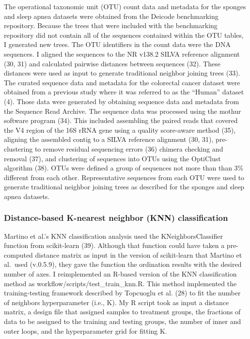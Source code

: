 \documentclass[
  11pt,
]{article}
\begin{document}
The operational taxonomic unit (OTU) count data and metadata for the
sponges and sleep apnea datasets were obtained from the Deicode
benchmarking repository. Because the trees that were included with the
benchmarking repository did not contain all of the sequences contained
within the OTU tables, I generated new trees. The OTU identifiers in the
count data were the DNA sequences. I aligned the sequences to the NR
v138.2 SILVA reference alignment (30, 31) and calculated pairwise
distances between sequences (32). These distances were used as input to
generate traditional neighbor joining trees (33). The curated sequence
data and metadata for the colorectal cancer dataset were obtained from a
previous study where it was referred to as the ``Human'' dataset (4).
Those data were generated by obtaining sequence data and metadata from
the Sequence Read Archive. The sequence data was processed using the
mothur software program (34). This included assembling the paired reads
that covered the V4 region of the 16S rRNA gene using a quality
score-aware method (35), aligning the assembled contig to a SILVA
reference alignment (30, 31), pre-clustering to remove residual
sequencing errors (36) chimera checking and removal (37), and clustering
of sequences into OTUs using the OptiClust algorithm (38). OTUs were
defined a group of sequences not more than than 3\% different from each
other. Representative sequences from each OTU were used to generate
traditional neighbor joining trees as described for the sponges and
sleep apnea datasets.

\subsubsection{Distance-based K-nearest neighbor (KNN)
classification}\label{distance-based-k-nearest-neighbor-knn-classification}

Martino et al.'s KNN classification analysis used the
KNeighborsClassifier function from scikit-learn (39). Although that
function could have taken a pre-computed distance matrix as input in the
version of scikit-learn that Martino et al.~used (v.0.5.9), they gave
the function the ordination results with the desired number of axes. I
reimplemented an R-based version of the KNN classification method as
workflow/scripts/test\_train\_knn.R. This method implemented the
training-testing framework described by Topcuoglu et al. (28) to fit the
number of neighbors hyperparameter (i.e., K). My R script took as input
a distance matrix, a design file that assigned samples to treatment
groups, the fractions of data to be assigned to the training and testing
groups, the number of inner and outer loops, and the hyperparameter grid
for fitting K.
\end{document}
